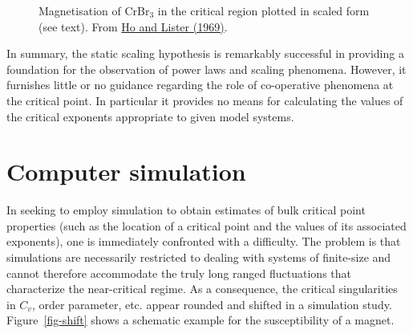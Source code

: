 \documentclass[
  letterpaper,
  enabledeprecatedfontcommands]{report}
\begin{document}
\begin{figure}


\caption{\label{fig-scalingexp}Magnetisation of CrBr\(_3\) in the
critical region plotted in scaled form (see text). From
\href{https://journals.aps.org/prl/abstract/10.1103/PhysRevLett.22.603}{Ho
and Lister (1969)}.}

\end{figure}%

In summary, the static scaling hypothesis is remarkably successful in
providing a foundation for the observation of power laws and scaling
phenomena. However, it furnishes little or no guidance regarding the
role of co-operative phenomena at the critical point. In particular it
provides no means for calculating the values of the critical exponents
appropriate to given model systems.

\section{Computer simulation}\label{sec-compsim}

In seeking to employ simulation to obtain estimates of bulk critical
point properties (such as the location of a critical point and the
values of its associated exponents), one is immediately confronted with
a difficulty. The problem is that simulations are necessarily restricted
to dealing with systems of finite-size and cannot therefore accommodate
the truly long ranged fluctuations that characterize the near-critical
regime. As a consequence, the critical singularities in \(C_v\), order
parameter, etc. appear rounded and shifted in a simulation study.
Figure~\ref{fig-shift} shows a schematic example for the susceptibility
of a magnet.
\end{document}
